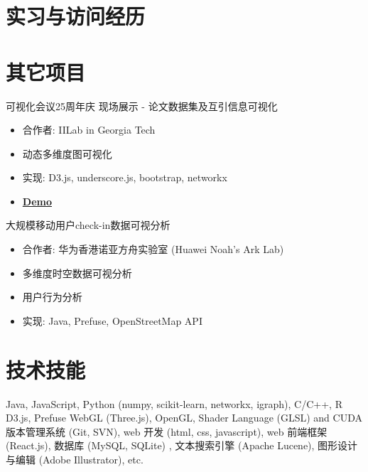 \documentclass[10pt,a4paper,roman]{moderncv} %
\begin{document}
\vspace{0.2cm}

\section{实习与访问经历}


\section{其它项目}
 {可视化会议25周年庆 现场展示 - 论文数据集及互引信息可视化
	\begin{itemize}
	\item 合作者: IILab in Georgia Tech
	\item 动态多维度图可视化
	\item 实现: D3.js, underscore.js, bootstrap, networkx
	\item \href{http://www.cc.gatech.edu/gvu/ii/citevis/VIS25/}{\textbf{Demo}}
	\end{itemize}
}

 {大规模移动用户check-in数据可视分析
	\begin{itemize}
	\item 合作者: 华为香港诺亚方舟实验室 (Huawei Noah's Ark Lab)
	\item 多维度时空数据可视分析
	\item 用户行为分析
	\item 实现: Java, Prefuse, OpenStreetMap API
	\end{itemize}
}


\section{技术技能}

 {Java, JavaScript, Python (numpy, scikit-learn, networkx, igraph), C/C++, R}
 {D3.js, Prefuse}
 {WebGL (Three.js), OpenGL, Shader Language (GLSL) and CUDA}
 {版本管理系统 (Git, SVN), web 开发 (html, css, javascript), web 前端框架 (React.js), 数据库 (MySQL, SQLite) , 文本搜索引擎 (Apache Lucene), 图形设计与编辑 (Adobe Illustrator), etc.}
\end{document}
